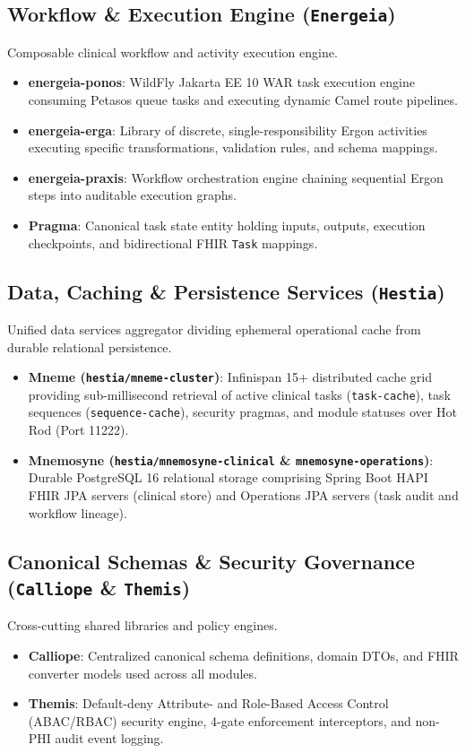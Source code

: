 \subsection{Workflow \& Execution Engine (\texttt{Energeia})}
Composable clinical workflow and activity execution engine.
\begin{itemize}
    \item \textbf{energeia-ponos}: WildFly Jakarta EE 10 WAR task execution engine consuming Petasos queue tasks and executing dynamic Camel route pipelines.
    \item \textbf{energeia-erga}: Library of discrete, single-responsibility Ergon activities executing specific transformations, validation rules, and schema mappings.
    \item \textbf{energeia-praxis}: Workflow orchestration engine chaining sequential Ergon steps into auditable execution graphs.
    \item \textbf{Pragma}: Canonical task state entity holding inputs, outputs, execution checkpoints, and bidirectional FHIR \texttt{Task} mappings.
\end{itemize}

\subsection{Data, Caching \& Persistence Services (\texttt{Hestia})}
Unified data services aggregator dividing ephemeral operational cache from durable relational persistence.
\begin{itemize}
    \item \textbf{Mneme (\texttt{hestia/mneme-cluster})}: Infinispan 15+ distributed cache grid providing sub-millisecond retrieval of active clinical tasks (\nolinkurl{task-cache}), task sequences (\nolinkurl{sequence-cache}), security pragmas, and module statuses over Hot Rod (Port 11222).
    \item \textbf{Mnemosyne (\texttt{hestia/mnemosyne-clinical} \& \texttt{mnemosyne-operations})}: Durable PostgreSQL 16 relational storage comprising Spring Boot HAPI FHIR JPA servers (clinical store) and Operations JPA servers (task audit and workflow lineage).
\end{itemize}

\subsection{Canonical Schemas \& Security Governance (\texttt{Calliope} \& \texttt{Themis})}
Cross-cutting shared libraries and policy engines.
\begin{itemize}
    \item \textbf{Calliope}: Centralized canonical schema definitions, domain DTOs, and FHIR converter models used across all modules.
    \item \textbf{Themis}: Default-deny Attribute- and Role-Based Access Control (ABAC/RBAC) security engine, 4-gate enforcement interceptors, and non-PHI audit event logging.
\end{itemize}


